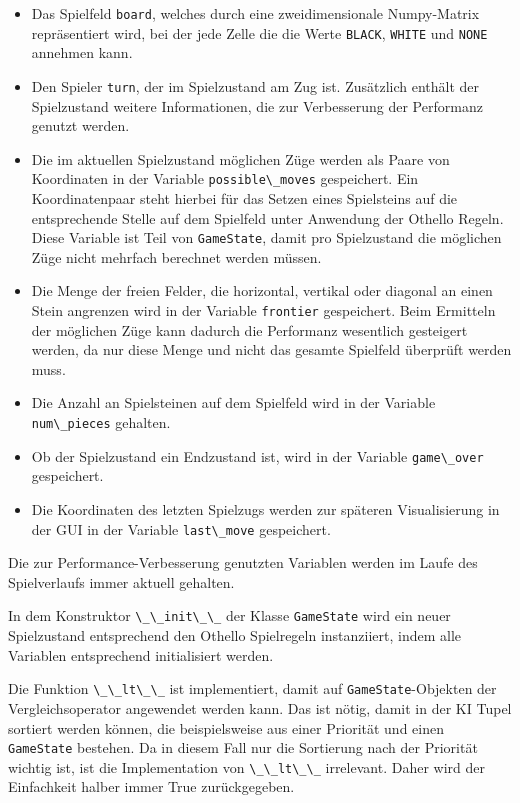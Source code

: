 \begin{itemize}
\tightlist
\item
  Das Spielfeld \passthrough{\lstinline!board!}, welches durch eine
  zweidimensionale Numpy-Matrix repräsentiert wird, bei der jede Zelle
  die die Werte \passthrough{\lstinline!BLACK!},
  \passthrough{\lstinline!WHITE!} und \passthrough{\lstinline!NONE!}
  annehmen kann.
\item
  Den Spieler \passthrough{\lstinline!turn!}, der im Spielzustand am Zug
  ist. Zusätzlich enthält der Spielzustand weitere Informationen, die
  zur Verbesserung der Performanz genutzt werden.
\item
  Die im aktuellen Spielzustand möglichen Züge werden als Paare von
  Koordinaten in der Variable \passthrough{\lstinline!possible\_moves!}
  gespeichert. Ein Koordinatenpaar steht hierbei für das Setzen eines
  Spielsteins auf die entsprechende Stelle auf dem Spielfeld unter
  Anwendung der Othello Regeln. Diese Variable ist Teil von
  \passthrough{\lstinline!GameState!}, damit pro Spielzustand die
  möglichen Züge nicht mehrfach berechnet werden müssen.
\item
  Die Menge der freien Felder, die horizontal, vertikal oder diagonal an
  einen Stein angrenzen wird in der Variable
  \passthrough{\lstinline!frontier!} gespeichert. Beim Ermitteln der
  möglichen Züge kann dadurch die Performanz wesentlich gesteigert
  werden, da nur diese Menge und nicht das gesamte Spielfeld überprüft
  werden muss.
\item
  Die Anzahl an Spielsteinen auf dem Spielfeld wird in der Variable
  \passthrough{\lstinline!num\_pieces!} gehalten.
\item
  Ob der Spielzustand ein Endzustand ist, wird in der Variable
  \passthrough{\lstinline!game\_over!} gespeichert.
\item
  Die Koordinaten des letzten Spielzugs werden zur späteren
  Visualisierung in der \ac{GUI} in der Variable
  \passthrough{\lstinline!last\_move!} gespeichert.
\end{itemize}

Die zur Performance-Verbesserung genutzten Variablen werden im Laufe des
Spielverlaufs immer aktuell gehalten.

In dem Konstruktor \passthrough{\lstinline!\_\_init\_\_!} der Klasse
\passthrough{\lstinline!GameState!} wird ein neuer Spielzustand
entsprechend den Othello Spielregeln instanziiert, indem alle Variablen
entsprechend initialisiert werden.

Die Funktion \passthrough{\lstinline!\_\_lt\_\_!} ist implementiert,
damit auf \passthrough{\lstinline!GameState!}-Objekten der
Vergleichsoperator angewendet werden kann. Das ist nötig, damit in der
\ac{KI} Tupel sortiert werden können, die beispielsweise aus einer
Priorität und einen \passthrough{\lstinline!GameState!} bestehen. Da in
diesem Fall nur die Sortierung nach der Priorität wichtig ist, ist die
Implementation von \passthrough{\lstinline!\_\_lt\_\_!} irrelevant.
Daher wird der Einfachkeit halber immer True zurückgegeben.

